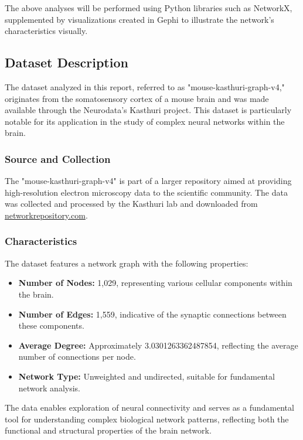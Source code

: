 \documentclass[
	report, %
	11pt, %
]{CSUniSchoolLabReport}
\begin{document}
		The above analyses will be performed using Python libraries such as NetworkX, supplemented by visualizations created in Gephi to illustrate the network's characteristics visually.

		\subsection{Dataset Description}

		The dataset analyzed in this report, referred to as "mouse-kasthuri-graph-v4," originates from the somatosensory cortex of a mouse brain and was made available through the Neurodata's Kasthuri project. This dataset is particularly notable for its application in the study of complex neural networks within the brain.
		
		\subsubsection{Source and Collection}
		
		The "mouse-kasthuri-graph-v4" is part of a larger repository aimed at providing high-resolution electron microscopy data to the scientific community. The data was collected and processed by the Kasthuri lab and downloaded from \href{http://networkrepository.com/mouse-kasthuri-graph-v4.php}{networkrepository.com}.
		
		\subsubsection{Characteristics}
		
		The dataset features a network graph with the following properties:
		\begin{itemize}
			\item \textbf{Number of Nodes:} 1,029, representing various cellular components within the brain.
			\item \textbf{Number of Edges:} 1,559, indicative of the synaptic connections between these components.
			\item \textbf{Average Degree:} Approximately \num{3.0301263362487854}, reflecting the average number of connections per node.
			\item \textbf{Network Type:} Unweighted and undirected, suitable for fundamental network analysis.
		\end{itemize}
		\vspace{10pt}
		
		The data enables exploration of neural connectivity and serves as a fundamental tool for understanding complex biological network patterns, reflecting both the functional and structural properties of the brain network.
		
\end{document}
